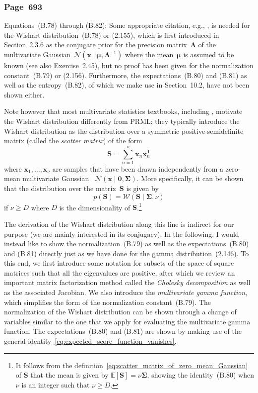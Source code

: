 \documentclass[12pt,a4paper]{article}
\newcommand{\erratum}[1]{%
\subsubsection*{#1}
\addcontentsline{toc}{subsection}{#1}}
\begin{document}
\erratum{Page~693}
Equations~(B.78) through (B.82):
Some appropriate citation, e.g., \citet{Anderson:Multivariate}, is needed for
the Wishart distribution~(B.78) or (2.155),
which is first introduced in Section~2.3.6 as
the conjugate prior for the precision matrix~$\bm{\Lambda}$ of
the multivariate Gaussian~$\mathcal{N}\left(\mathbf{x}\middle|\bm{\mu}, \bm{\Lambda}^{-1}\right)$
where the mean~$\bm{\mu}$ is assumed to be known (see also Exercise~2.45),
but no proof has been given for the normalization constant~(B.79) or (2.156).
Furthermore, the expectations~(B.80) and (B.81) as well as the entropy~(B.82),
of which we make use in Section~10.2,
have not been shown either.

Note however that most multivariate statistics textbooks, including \citet{Anderson:Multivariate},
motivate the Wishart distribution differently from PRML;
they typically introduce the Wishart distribution
as the distribution over a symmetric positive-semidefinite matrix
(called the \emph{scatter matrix}) of the form
\begin{equation}
\mathbf{S} = \sum_{n=1}^{\nu} \mathbf{x}_n \mathbf{x}_n^{\operatorname{T}}
\label{eq:scatter_matrix_of_zero_mean_Gaussian}
\end{equation}
where $\mathbf{x}_1, \dots, \mathbf{x}_\nu$ are samples that have been drawn
independently from a zero-mean multivariate Gaussian~%
$\mathcal{N}\left(\mathbf{x}\middle|\mathbf{0}, \bm{\Sigma}\right)$.
More specifically, it can be shown that the distribution over the matrix~$\mathbf{S}$ is given by
\begin{equation}
p(\mathbf{S}) = \mathcal{W}\left(\mathbf{S}\middle|\bm{\Sigma}, \nu\right)
\end{equation}
if $\nu \geqslant D$ where $D$ is the dimensionality of $\mathbf{S}$.\footnote{%
It follows from the definition~\eqref{eq:scatter_matrix_of_zero_mean_Gaussian} of
$\mathbf{S}$ that the mean is given by $\mathbb{E}\left[\mathbf{S}\right] = \nu\bm{\Sigma}$,
showing the identity~(B.80) when $\nu$ is an integer such that $\nu \geqslant D$.}

The derivation of the Wishart distribution along this line is indirect for our purpose
(we are mainly interested in its conjugacy).
In the following,
I would instead like to show the normalization~(B.79) as well as the expectations~(B.80) and (B.81)
directly just as we have done for the gamma distribution~(2.146).
To this end, we first introduce some notation for subsets of the space of square matrices
such that all the eigenvalues are positive,
after which we review an important matrix factorization method called
the \emph{Cholesky decomposition} as well as the associated Jacobian.
We also introduce the \emph{multivariate gamma function}, which simplifies
the form of the normalization constant~(B.79).
The normalization of the Wishart distribution can be shown through a change of variables
similar to the one that we apply for evaluating the multivariate gamma function.
The expectations~(B.80) and (B.81) are shown by making use of
the general identity~\eqref{eq:expected_score_function_vanishes}.
\end{document}
